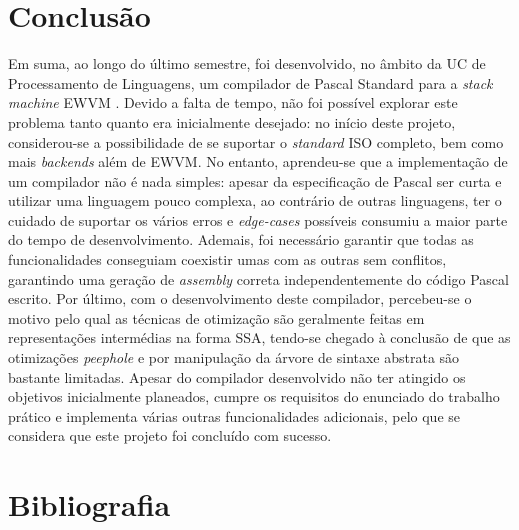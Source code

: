 \documentclass[12pt, a4paper]{article}
\begin{document}
\section{Conclusão}

Em suma, ao longo do último semestre, foi desenvolvido, no âmbito da UC de Processamento de
Linguagens, um compilador de Pascal Standard \cite{iso} para a \emph{stack machine} EWVM
\cite{ewvm}. Devido a falta de tempo, não foi possível explorar este problema tanto quanto era
inicialmente desejado: no início deste projeto, considerou-se a possibilidade de se suportar o
\emph{standard} ISO completo, bem como mais \emph{backends} além de EWVM. No entanto, aprendeu-se
que a implementação de um compilador não é nada simples: apesar da especificação de Pascal ser
curta e utilizar uma linguagem pouco complexa, ao contrário de outras linguagens, ter o cuidado
de suportar os vários erros e \emph{edge-cases} possíveis consumiu a maior parte do tempo de
desenvolvimento. Ademais, foi necessário garantir que todas as funcionalidades conseguiam coexistir
umas com as outras sem conflitos, garantindo uma geração de \emph{assembly} correta
independentemente do código Pascal escrito. Por último, com o desenvolvimento deste compilador,
percebeu-se o motivo pelo qual as técnicas de otimização são geralmente feitas em representações
intermédias na forma SSA, tendo-se chegado à conclusão de que as otimizações \emph{peephole} e por
manipulação da árvore de sintaxe abstrata são bastante limitadas. Apesar do compilador desenvolvido
não ter atingido os objetivos inicialmente planeados, cumpre os requisitos do enunciado do trabalho
prático e implementa várias outras funcionalidades adicionais, pelo que se considera que este
projeto foi concluído com sucesso.

\begingroup
\section{Bibliografia}
\renewcommand{\section}[2]{}
\end{document}
